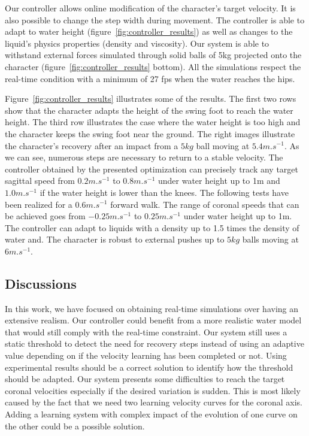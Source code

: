 \documentclass[runningheads,a4paper,10pt]{llncs}
\begin{document}
Our controller allows online modification of the character's target velocity. It is also possible to change the step width during movement. The controller is able to adapt to water height (figure~\ref{fig:controller_results}) as well as changes to the liquid's physics properties (density and viscosity). Our system is able to withstand external forces simulated through solid balls of 5kg projected onto the character (figure~\ref{fig:controller_results} bottom). All the simulations respect the real-time condition with a minimum of 27 fps when the water reaches the hips.

Figure~\ref{fig:controller_results} illustrates some of the results. The first two rows show that the character adapts the height of the swing foot to reach the water height. The third row illustrates the case where the water height is too high and the character keeps the swing foot near the ground. The right images illustrate the character's recovery after an impact from a $5kg$ ball moving at $5.4m.s^{-1}$. As we can see, numerous steps are necessary to return to a stable velocity.
The controller obtained by the presented optimization can precisely track any target sagittal speed from $0.2m.s^{-1}$ to $0.8m.s^{-1}$ under water height up to 1m and $1.0m.s^{-1}$ if the water height is lower than the knees. The following tests have been realized for a $0.6m.s^{-1}$ forward walk. The range of coronal speeds that can be achieved goes from $-0.25m.s^{-1}$ to $0.25m.s^{-1}$ under water height up to 1m. The controller can adapt to liquids with a density up to 1.5 times the density of water and. The character is robust to external pushes up to $5kg$ balls moving at $6m.s^{-1}$.
\subsection{Discussions}

In this work, we have focused on obtaining real-time simulations over having an extensive realism. Our controller could benefit from a more realistic water model that would still comply with the real-time constraint.
Our system still uses a static threshold to detect the need for recovery steps instead of using an adaptive value depending on if the velocity learning has been completed or not. Using experimental results should be a correct solution to identify how the threshold should be adapted.
Our system presents some difficulties to reach the target coronal velocities especially if the desired variation is sudden. This is most likely caused by the fact that we need two learning velocity curves for the coronal axis. Adding a learning system with complex impact of the evolution of one curve on the other could be a possible solution.
\end{document}
